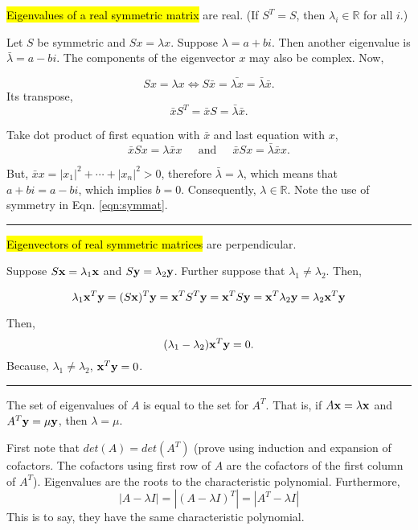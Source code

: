 \begin{questions}
\question \hl{Eigenvalues of a real symmetric matrix} are real.  (If $S^T = S$, then $\lambda_i \in \mathbb{R}$ for all $i$.)

\proof Let $S$ be symmetric and $S x = \lambda x$.  Suppose $\lambda = a+bi$.  Then another eigenvalue is $\bar{\lambda} = a-bi$.    The components of the eigenvector $x$ may also be complex.  Now, 

\[ Sx=\lambda x   \Leftrightarrow S \bar{x}=\bar{\lambda x} = \bar{\lambda} \bar{x }.\]
  Its transpose,   
\begin{equation}\label{eqn:symmat} \bar{x}S^T=\bar{x} S = \bar{\lambda} \bar{x }.\end{equation}

Take dot product of first equation with $\bar{x}$ and last equation with $x$, 
\[ \bar{x} Sx=\lambda \bar{x} x \;\;\;\; \text{ and } \;\;\;\;   \bar{x}Sx =   \bar{\lambda}  \bar{x }x .\]

But, $ \bar{x} x = |x_1|^2 + \cdots + |x_n|^2 >0$, therefore $\bar{\lambda} = \lambda$, which means that $a+bi = a-bi$, which implies $b=0$.  Consequently, $\lambda \in \mathbb{R}$.  Note the use of symmetry in Eqn. \ref{eqn:symmat}.

\rule[0.001in]{\textwidth}{0.00025in}








\question \hl{Eigenvectors of real symmetric matrices} are perpendicular.  

\proof Suppose $S{\bf x} = \lambda_1 {\bf x}$ and $S {\bf y} = \lambda_2 {\bf y}$. Further suppose that $\lambda_1 \ne \lambda_2$.  Then, 

\[  \lambda_1 {\bf x}^T{\bf y} = (S {\bf x})^T {\bf y}  = {\bf x}^T S^T {\bf y}  =  {\bf x}^T S{\bf y}  = {\bf x}^T \lambda_2 {\bf y}  =  \lambda_2 {\bf x}^T{\bf y}  \]

Then,
\[  ( \lambda_1  - \lambda_2 ) {\bf x}^T{\bf y} = 0. \]
Because, $\lambda_1 \ne \lambda_2$, $ {\bf x}^T{\bf y} = 0$.  

\rule[0.001in]{\textwidth}{0.00025in}










\question  The set of eigenvalues of $A$ is equal to the set for $A^T$.  That is, if $A {\bf x} = \lambda {\bf x}$ and $A^T {\bf y} = \mu {\bf y}$, then $\lambda = \mu$.  

\proof  First note that $det(A) = det(A^T)$ (prove using induction and expansion of cofactors.  The cofactors using first row of $A$ are the cofactors of the first column of $A^T$).  Eigenvalues are the roots to the characteristic polynomial.  Furthermore, 
\[  | A - \lambda I | = | (A - \lambda I)^T | = | A^T - \lambda I | \]
 This is to say, they have the same characteristic polynomial.



\end{questions}
